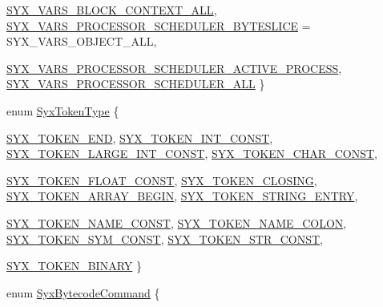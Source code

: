 \begin{CompactItemize}
\hyperlink{syx-enums_8h_c792ce905d7a570f1bf725aafa4d1d9b96ec5498aa7a9ffdb0df891eb6830787}{SYX\_\-VARS\_\-BLOCK\_\-CONTEXT\_\-ALL}, 
\hyperlink{syx-enums_8h_c792ce905d7a570f1bf725aafa4d1d9bb6c0e26ab7b0904d97296b1432096d66}{SYX\_\-VARS\_\-PROCESSOR\_\-SCHEDULER\_\-BYTESLICE} =  SYX\_\-VARS\_\-OBJECT\_\-ALL, 
\par
\hyperlink{syx-enums_8h_c792ce905d7a570f1bf725aafa4d1d9ba4f166043520db9833a426a1ee03fe66}{SYX\_\-VARS\_\-PROCESSOR\_\-SCHEDULER\_\-ACTIVE\_\-PROCESS}, 
\hyperlink{syx-enums_8h_c792ce905d7a570f1bf725aafa4d1d9b3b6643acdcf6ce15599fbc9fa855cac4}{SYX\_\-VARS\_\-PROCESSOR\_\-SCHEDULER\_\-ALL}
 \}
\item 
enum \hyperlink{syx-enums_8h_07b7e5545aac6b353ad9df2846fd96a9}{SyxTokenType} \{ \par
\hyperlink{syx-enums_8h_07b7e5545aac6b353ad9df2846fd96a9e8cbc72e50016fcc7bd2a112ceb1c039}{SYX\_\-TOKEN\_\-END}, 
\hyperlink{syx-enums_8h_07b7e5545aac6b353ad9df2846fd96a994f2824d9e4d8d4808b70961700fd5b8}{SYX\_\-TOKEN\_\-INT\_\-CONST}, 
\hyperlink{syx-enums_8h_07b7e5545aac6b353ad9df2846fd96a9b440a77d2588b893fd27fe0fcea99158}{SYX\_\-TOKEN\_\-LARGE\_\-INT\_\-CONST}, 
\hyperlink{syx-enums_8h_07b7e5545aac6b353ad9df2846fd96a9e1b6e7f1ba27d2dbed57da1856716131}{SYX\_\-TOKEN\_\-CHAR\_\-CONST}, 
\par
\hyperlink{syx-enums_8h_07b7e5545aac6b353ad9df2846fd96a992f5bc3ff267df5a539ba0c76a11a462}{SYX\_\-TOKEN\_\-FLOAT\_\-CONST}, 
\hyperlink{syx-enums_8h_07b7e5545aac6b353ad9df2846fd96a9fcf8e1eb24348df7b62debb4bcc8fef5}{SYX\_\-TOKEN\_\-CLOSING}, 
\hyperlink{syx-enums_8h_07b7e5545aac6b353ad9df2846fd96a96d20ee7a5beb99a81afdb9c8f23f98e7}{SYX\_\-TOKEN\_\-ARRAY\_\-BEGIN}, 
\hyperlink{syx-enums_8h_07b7e5545aac6b353ad9df2846fd96a9718d43e6931683a28b4f483ec926e859}{SYX\_\-TOKEN\_\-STRING\_\-ENTRY}, 
\par
\hyperlink{syx-enums_8h_07b7e5545aac6b353ad9df2846fd96a924967ea30d3ca0dfc6d1980ee26f6d22}{SYX\_\-TOKEN\_\-NAME\_\-CONST}, 
\hyperlink{syx-enums_8h_07b7e5545aac6b353ad9df2846fd96a957f7952867587c2b7dd886be4670d5af}{SYX\_\-TOKEN\_\-NAME\_\-COLON}, 
\hyperlink{syx-enums_8h_07b7e5545aac6b353ad9df2846fd96a97efa608e1b94ec308b32745320d604d0}{SYX\_\-TOKEN\_\-SYM\_\-CONST}, 
\hyperlink{syx-enums_8h_07b7e5545aac6b353ad9df2846fd96a97ad5ef2dfda534051c0cf4bc30276020}{SYX\_\-TOKEN\_\-STR\_\-CONST}, 
\par
\hyperlink{syx-enums_8h_07b7e5545aac6b353ad9df2846fd96a9d8546ffbf6b23eb1c5beb5298f3ac2ff}{SYX\_\-TOKEN\_\-BINARY}
 \}
\item 
enum \hyperlink{syx-enums_8h_d6d0f1ac8587fceead1a94be2bf9648a}{SyxBytecodeCommand} \{ \par

\end{CompactItemize}

